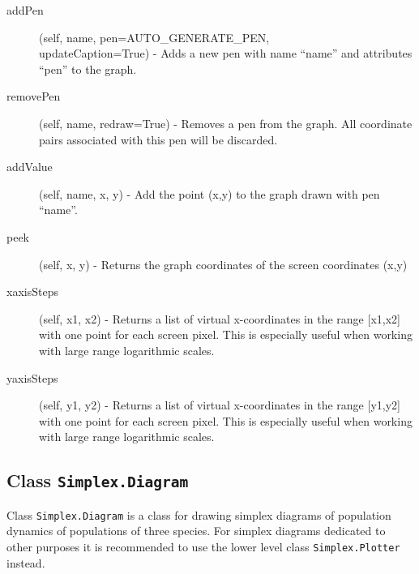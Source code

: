 \documentclass[12pt,a4paper,USenglish]{article}
\begin{document}
\begin{description}
\item[addPen] (self, name, pen=AUTO\_GENERATE\_PEN,\\
  updateCaption=True) - Adds a new pen with name ``name'' and
  attributes ``pen'' to the graph.

\item[removePen] (self, name, redraw=True) - Removes a pen from
        the graph. All coordinate pairs associated with this pen will
        be discarded.

\item[addValue] (self, name, x, y) - Add the point (x,y) to the graph drawn with
	pen ``name''.

\item[peek] (self, x, y) - Returns the graph coordinates of the screen 
	coordinates (x,y)

\item[xaxisSteps] (self, x1, x2) - Returns a list of virtual x-coordinates 
	in the range [x1,x2] with one point for each screen pixel. This is
	especially useful when working with large range logarithmic scales.

\item[yaxisSteps] (self, y1, y2) - Returns a list of virtual x-coordinates 
	in the range [y1,y2] with one point for each screen pixel.  This is
	especially useful when working with large range logarithmic scales.

\end{description}

\subsection{Class {\tt Simplex.Diagram}}

Class {\tt Simplex.Diagram} is a class for drawing simplex diagrams of
population dynamics of populations of three species. For simplex
diagrams dedicated to other purposes it is recommended to use the
lower level class {\tt Simplex.Plotter} instead.
\end{document}
